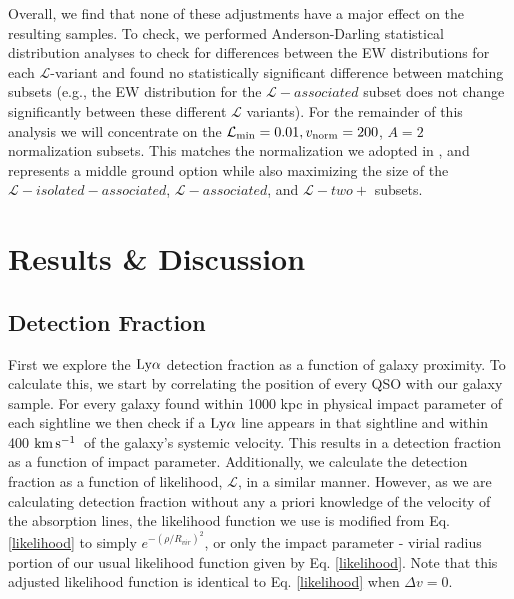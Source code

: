 \documentclass[twocolumn,tighten]{aastex62}
\newcommand{\kms}{$\rm km\, s^{-1}$}
\begin{document}
Overall, we find that none of these adjustments have a major effect on the resulting samples. To check, we performed Anderson-Darling statistical distribution analyses to check for differences between the EW distributions for each $\mathcal{L}$-variant and found no statistically significant difference between matching subsets (e.g., the EW distribution for the $\mathcal{L}-associated$ subset does not change significantly between these different $\mathcal{L}$ variants). For the remainder of this analysis we will concentrate on the $\mathcal{L}_{\rm min} = 0.01, v_{\rm norm} = 200$, $A = 2$ normalization subsets. This matches the normalization we adopted in \cite{french2017}, and represents a middle ground option while also maximizing the size of the $\mathcal{L}-isolated-associated$, $\mathcal{L}-associated$, and $\mathcal{L}-two+$ subsets.





\section{Results \& Discussion}
\subsection{Detection Fraction}
First we explore the $\rm Ly\alpha$ detection fraction as a function of galaxy proximity. To calculate this, we start by correlating the position of every QSO with our galaxy sample. For every galaxy found within 1000 kpc in physical impact parameter of each sightline we then check if a $\rm Ly\alpha$ line appears in that sightline and within 400 \kms~of the galaxy's systemic velocity. This results in a detection fraction as a function of impact parameter. Additionally, we calculate the detection fraction as a function of likelihood, $\mathcal{L}$, in a similar manner. However, as we are calculating detection fraction without any a priori knowledge of the velocity of the absorption lines, the likelihood function we use is modified from Eq. \ref{likelihood} to simply $e^{-(\rho/R_{vir})^2}$, or only the impact parameter - virial radius portion of our usual likelihood function given by Eq. \ref{likelihood}. Note that this adjusted likelihood function is identical to Eq. \ref{likelihood} when $\Delta v = 0$. 
\end{document}
